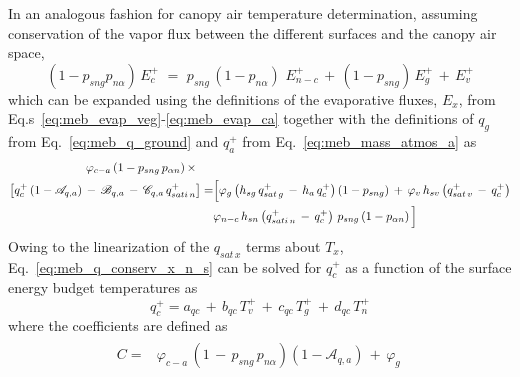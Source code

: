 {In an analogous fashion for canopy air temperature determination, 
assuming conservation of the vapor flux between the different
surfaces and the canopy air space, 
%
\begin{equation}
\label{eq:meb_evap_ca}
\left(1-p_{sng}p_{n\alpha}\right)\,E_{c}^+
\,\, = \,\, 
p_{sng}\,\left(1-p_{n\alpha}\right) \, 
\,E_{n-c}^+ \,+\, \left(1-p_{sng}\right)\,E_{g}^+\,+\, E_{v}^+ 
\end{equation}
%
which can be expanded using the definitions of the evaporative fluxes, $E_x$,
from Eq.s~\ref{eq:meb_evap_veg}-\ref{eq:meb_evap_ca}
together with the definitions of $q_g$ from Eq.~\ref{eq:meb_q_ground}
and $q_a^+$ from Eq.~\ref{eq:meb_mass_atmos_a}
as
%
\begin{equation}
\label{eq:meb_q_conserv_x_n_s}
\begin{split}
\varphi_{c-a} \left(1-p_{sng}\,p_{\alpha n} \right) 
\times 
\hskip.2in &
\\
\left[ q_c^+ \left( 1 - {\mathscr A}_{q,a}\right) \,-\, {\mathscr B}_{q,a} 
\,-\,  {\mathscr C}_{q,a} \, q_{sati\,n}^+
\right] = &  \Big\lbrack
\varphi_{g} \left( h_{sg} \, q_{sat\,g}^+ \,-\,h_a\,q_c^+ \right) \left(1-p_{sng}\right) \,+\, 
\varphi_{v} \,h_{sv} \left( q_{sat\,v}^+ \,-\,q_c^+ \right) 
\\
& \varphi_{n-c} \, h_{sn} \left( q_{sati\,n}^+ \,-\,q_c^+ \right) \,p_{sng}\left(1-p_{\alpha n}\right)
\Big\rbrack
%
\end{split}
\end{equation}
%
Owing to the linearization of the $q_{sat\,x}$ terms
about $T_x$, Eq.~\ref{eq:meb_q_conserv_x_n_s} can be solved for $q_c^+$
as a function of the surface energy budget temperatures as
%
\begin{equation}
\label{eq:meb_canopy_q_update}
q_c^+ = a_{qc} \,+\, b_{qc}\,T_v^+ \,+\, c_{qc}\,T_g^+\,+\, d_{qc}\,T_n^+
\end{equation}
%
where the coefficients are defined as
%
\begin{subequations}\label{eq:meb_qc_eq_s_coefs_n_a}
\begin{align}
\begin{split}
C =& \varphi_{c-a}\, \left(1 \,-\,p_{sng}\,p_{n\alpha} \right)
\left(1-{\mathscr A}_{q,a}\right) 
\,+\,\varphi_{g} \,

\end{split}
\end{align}
\end{subequations}}
